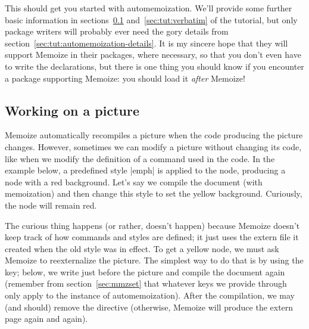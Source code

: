 \documentclass[a4paper,11pt]{article}
\begin{document}
This should get you started with automemoization.  We'll provide some further
basic information in sections~\ref{sec:tut:working-on-a-picture}
and~\ref{sec:tut:verbatim} of the tutorial, but only package writers will
probably ever need the gory details from
section~\ref{sec:tut:automemoization-details}.  It is my sincere hope that they
will support Memoize in their packages, where necessary, so that you don't even
have to write the  declarations, but there is one thing you should
know if you encounter a package supporting Memoize: you should load it
\emph{after} Memoize!



\subsection{Working on a picture}
\label{sec:tut:working-on-a-picture}


Memoize automatically recompiles a picture when the code producing the picture
changes.  However, sometimes we can modify a picture without changing its code,
like when we modify the definition of a command used in the code.  In the
example below, a predefined style |emph| is applied to the node, producing a
node with a red background.  Let's say we compile the document (with
memoization) and then change this style to set the yellow background.
Curiously, the node will remain red.

\begin{tcbraster}[raster columns=2, raster valign=top, raster column skip=4mm]
\end{tcbraster}

The curious thing happens (or rather, doesn't happen) because Memoize doesn't
keep track of how commands and styles are defined; it just uses the extern file
it created when the old style was in effect.  To get a yellow node, we must ask
Memoize to reexternalize the picture.  The simplest way to do that is by using
the  key; below, we write
 just before the picture and
compile the document again (remember from section~\ref{sec:mmzset} that
whatever keys we provide through  only apply to the instance of
automemoization).  After the compilation, we may (and should) remove the
 directive (otherwise, Memoize will produce the extern page
again and again).
\end{document}
